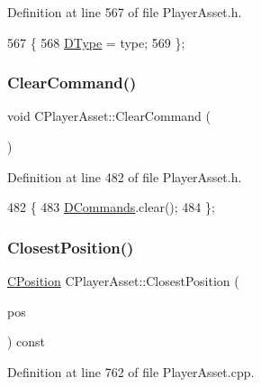 Definition at line 567 of file Player\+Asset.\+h.


\begin{DoxyCode}
567                                                                \{
568             \hyperlink{classCPlayerAsset_a5d61f73471e1e6f0a6ab15f2ffa7b359}{DType} = type;
569         \};
\end{DoxyCode}
\hypertarget{classCPlayerAsset_ad4b1ea5ddba1c2b5dbee5ee5015e193b}{}\label{classCPlayerAsset_ad4b1ea5ddba1c2b5dbee5ee5015e193b} 
\subsubsection{\texorpdfstring{Clear\+Command()}{ClearCommand()}}
{\footnotesize\ttfamily void C\+Player\+Asset\+::\+Clear\+Command (\begin{DoxyParamCaption}{ }\end{DoxyParamCaption})\hspace{0.3cm}{\ttfamily [inline]}}



Definition at line 482 of file Player\+Asset.\+h.


\begin{DoxyCode}
482                            \{
483             \hyperlink{classCPlayerAsset_a4d3b96106d3b1c1020f98005884d2a87}{DCommands}.clear();  
484         \};
\end{DoxyCode}
\hypertarget{classCPlayerAsset_a67e700ce77122894c02da584dd652767}{}\label{classCPlayerAsset_a67e700ce77122894c02da584dd652767} 
\subsubsection{\texorpdfstring{Closest\+Position()}{ClosestPosition()}}
{\footnotesize\ttfamily \hyperlink{classCPosition}{C\+Position} C\+Player\+Asset\+::\+Closest\+Position (\begin{DoxyParamCaption}\item[{const \hyperlink{classCPosition}{C\+Position} \&}]{pos }\end{DoxyParamCaption}) const}



Definition at line 762 of file Player\+Asset.\+cpp.



